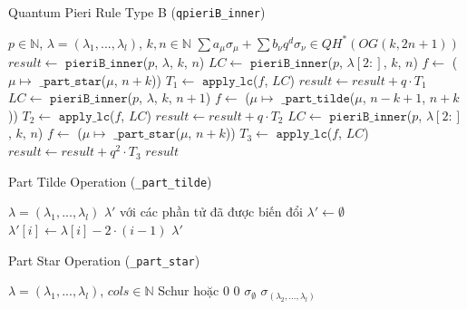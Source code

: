 \begin{algorithm}[H]
\caption{Quantum Pieri Rule Type B (\texttt{qpieriB\_inner})}
\begin{algorithmic}[1]
\REQUIRE $p \in \mathbb{N}$, $\lambda = (\lambda_1, ..., \lambda_l)$, $k, n \in \mathbb{N}$
\ENSURE $\sum a_\mu \sigma_\mu + \sum b_\nu q^d \sigma_\nu \in QH^*(OG(k,2n+1))$
\STATE $result \gets$ $\mathtt{pieriB\_inner}$($p$, $\lambda$, $k$, $n$)
        \STATE $LC \gets$ $\mathtt{pieriB\_inner}$($p$, $\lambda[2:]$, $k$, $n$)
        \STATE $f \gets$ ($\mu \mapsto$ $\mathtt{\_part\_star}$($\mu$, $n+k$))
        \STATE $T_1 \gets$ $\mathtt{apply\_lc}$($f$, $LC$)
        \STATE $result \gets result + q \cdot T_1$
    \ENDIF
\ELSE
        \STATE $LC \gets$ $\mathtt{pieriB\_inner}$($p$, $\lambda$, $k$, $n+1$)
        \STATE $f \gets$ ($\mu \mapsto$ $\mathtt{\_part\_tilde}$($\mu$, $n-k+1$, $n+k$))
        \STATE $T_2 \gets$ $\mathtt{apply\_lc}$($f$, $LC$)
        \STATE $result \gets result + q \cdot T_2$
    \ENDIF
        \STATE $LC \gets$ $\mathtt{pieriB\_inner}$($p$, $\lambda[2:]$, $k$, $n$)
        \STATE $f \gets$ ($\mu \mapsto$ $\mathtt{\_part\_star}$($\mu$, $n+k$))
        \STATE $T_3 \gets$ $\mathtt{apply\_lc}$($f$, $LC$)
        \STATE $result \gets result + q^2 \cdot T_3$
    \ENDIF
\ENDIF
\RETURN $result$
\end{algorithmic}
\end{algorithm}

\begin{algorithm}[H]
\caption{Part Tilde Operation (\texttt{\_part\_tilde})}
\begin{algorithmic}[1]
\REQUIRE $\lambda = (\lambda_1, ..., \lambda_l)$
\ENSURE $\lambda'$ với các phần tử đã được biến đổi
\STATE $\lambda' \gets \emptyset$
    \STATE $\lambda'[i] \gets \lambda[i] - 2 \cdot (i-1)$
\ENDFOR
\RETURN $\lambda'$
\end{algorithmic}
\end{algorithm}

\begin{algorithm}[H]
\caption{Part Star Operation (\texttt{\_part\_star})}
\begin{algorithmic}[1]
\REQUIRE $\lambda = (\lambda_1, ..., \lambda_l)$, $cols \in \mathbb{N}$
\ENSURE Schur hoặc $0$
    \RETURN $0$
\ENDIF
{}
    \RETURN $\sigma_{\emptyset}$
\ENDIF
\RETURN $\sigma_{(\lambda_2, ..., \lambda_l)}$
\end{algorithmic}
\end{algorithm}
